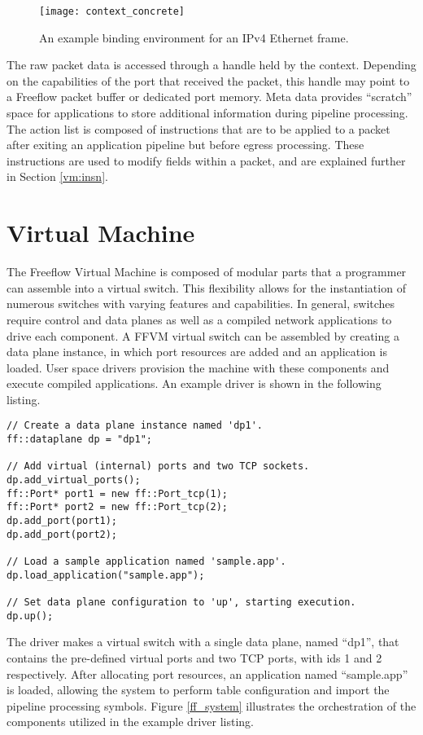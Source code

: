 \begin{figure}[h!]
\centering
\texttt{[image: context\_concrete]}
\caption{An example binding environment for an IPv4 Ethernet frame.}
\label{context_binding}
\end{figure}

The raw packet data is accessed through a handle held by the context. Depending
on the capabilities of the port that received the packet, this handle may point
to a Freeflow packet buffer or dedicated port memory. Meta data provides
``scratch'' space for applications to store additional information during
pipeline processing. The action list is composed of instructions that are to
be applied to a packet after exiting an application pipeline but before egress
processing. These instructions are used to modify fields within a packet, and
are explained further in Section \ref{vm:insn}.



\section{Virtual Machine}
\label{vm}
The Freeflow Virtual Machine is composed of modular parts that a programmer can
assemble into a virtual switch. This flexibility allows for the instantiation
of numerous switches with varying features and capabilities. In general,
switches require control and data planes as well as a compiled network
applications to drive each component. A FFVM virtual switch can be assembled
by creating a data plane instance, in which port resources are added and an
application is loaded. User space drivers provision the machine with these
components and execute compiled applications. An example driver is shown in the
following listing.

\begin{lstlisting}
// Create a data plane instance named 'dp1'.
ff::dataplane dp = "dp1";

// Add virtual (internal) ports and two TCP sockets.
dp.add_virtual_ports();
ff::Port* port1 = new ff::Port_tcp(1);
ff::Port* port2 = new ff::Port_tcp(2);
dp.add_port(port1);
dp.add_port(port2);

// Load a sample application named 'sample.app'.
dp.load_application("sample.app");

// Set data plane configuration to 'up', starting execution.
dp.up();
\end{lstlisting}

The driver makes a virtual switch with a single data plane, named ``dp1'', that
contains the pre-defined virtual ports and two TCP ports, with ids 1 and 2
respectively. After allocating port resources, an application named
``sample.app'' is loaded, allowing the system to perform table configuration
and import the pipeline processing symbols. Figure \ref{ff_system} illustrates
the orchestration of the components utilized in the example driver listing.

